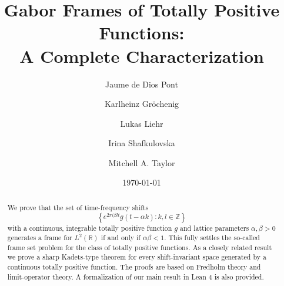 \documentclass[reqno,a4paper,12pt]{amsart}
\numberwithin{equation}{section}
\def\Z{{\mathbb Z}}
\def\R{{\mathbb R}}
\newcommand\1{\mathds{1}}
\begin{document}
\title[Gabor Frames of Totally Positive Functions]{Gabor Frames  of
  Totally Positive Functions: \\ A Complete Characterization}

\author[J. de Dios Pont]{Jaume de Dios Pont}
\address{Center for Data Science, New York University, New York, New York 10011, USA}

\author[K. Gröchenig]{Karlheinz Gröchenig}
\address{Faculty of Mathematics, University of Vienna, Oskar-Morgenstern-Platz 1, A-1090 Vienna, Austria}

\author[L. Liehr]{Lukas Liehr}
\address{Department of Mathematics, Bar-Ilan University, Ramat-Gan 5290002, Israel}

\author[I. Shafkulovska]{Irina Shafkulovska}
\address{Faculty of Mathematics, University of Vienna, Oskar-Morgenstern-Platz 1, A-1090 Vienna, Austria}

\author[M. A. Taylor]{Mitchell A. Taylor}
\address{ Department of Mathematics, ETH Z\"urich, Ramistrasse 101, 8092 Z\"urich, Switzerland}

\date{\today}

\begin{abstract}
We prove that the set of time-frequency shifts
$$\left \{ e^{2\pi i \beta lt }g(t-\alpha k) : k,l\in \Z \right \}$$ with a continuous,
integrable  totally positive function $g$  and lattice parameters $\alpha ,\beta
>0$ generates a frame for $L^2(\R)$ if and
only if $\alpha \beta <1$. This fully settles the so-called  frame set problem for the
class of totally positive functions. As a closely related result we
prove a  sharp Kadets-type theorem for every shift-invariant space
generated by  a continuous totally positive function. The proofs are  based on
Fredholm theory and limit-operator theory. A formalization of our main
 result in Lean 4 is also provided. 
\end{abstract}


\maketitle
\end{document}
